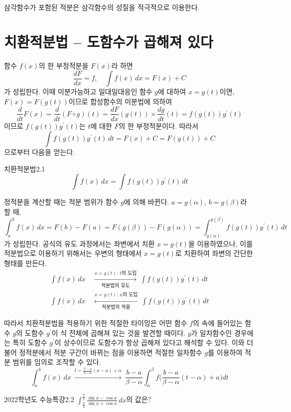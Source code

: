 \documentclass{article}
\begin{document}
\begin{remark}
	삼각함수가 포함된 적분은 삼각함수의 성질을 적극적으로 이용한다.
\end{remark}

\section{치환적분법 -- 도함수가 곱해져 있다}
함수 $f(x)$의 한 부정적분을 $F(x)$라 하면
\[
	\frac{dF}{dx}=f,\quad\int f(x)\,dx=F(x)+C
\]
가 성립한다. 이때 미분가능하고 일대일대응인 함수 $g$에 대하여 $x=g(t)$이면, $F(x)=F(g(t))$이므로 합성함수의 미분법에 의하여
\[
	\frac{d}{dt}F(x)=\frac{d}{dt}(F\circ g)(t)=\frac{dF}{dx}(g(t))\times\frac{dg}{dt}(t)=f(g(t))g^{\prime}(t)
\]
이므로 $f(g(t))g^{\prime}(t)$는 $t$에 대한 $F$의 한 부정적분이다. 따라서 
\[
	\int f(g(t))g^{\prime}(t)\,dt=F(x)+C=F(g(t))+C
\]
으로부터 다음을 얻는다.
\begin{thm}{치환적분법}{2.1}
	\[
		\int f(x)\,dx=\int f(g(t))g^{\prime}(t)\,dt
	\]
\end{thm}

정적분을 계산할 때는 적분 범위가 함수 $g$에 의해 바뀐다. $a=g(\alpha)$, $b=g(\beta)$라 할 때,
\[
	\int_a^bf(x)\,dx=F(b)-F(a)=F(g(\beta))-F(g(\alpha))=\int_{g(\alpha)}^{g(\beta)}f(g(t))g^{\prime}(t)\,dt
\]
가 성립한다. 공식의 유도 과정에서는 좌변에서 치환 $x=g(t)$을 이용하였으나, 이를 적분법으로 이용하기 위해서는 우변의 형태에서 $x=g(t)$로 치환하여 좌변의 간단한 형태를 만든다.
\begin{align*}
	\int f(x)\,dx~&\xrightarrow[\text{적분법의 유도}]{x=g(t):~t\text{의 도입}}~\int f(g(t))g^{\prime}(t)\,dt\\[6pt]
\int f(x)\,dx~&\xleftarrow[\text{적분법의 적용}]{x=g(t):~x\text{의 도입}}~\int f(g(t))g^{\prime}(t)\,dt
\end{align*}

따라서 치환적분법을 적용하기 위한 적절한 타이밍은 어떤 함수 $f$의 속에 들어있는 함수 $g$의 도함수 $g^{\prime}$이 식 전체에 곱해져 있는 것을 발견할 때이다. $g$가 일차함수인 경우에는 특히 도함수 $g^{\prime}$이 상수이므로 도함수가 항상 곱해져 있다고 해석할 수 있다. 이와 더불어 정적분에서 적분 구간이 바뀌는 점을 이용하면 적절한 일차함수 $g$를 이용하여 적분 범위를 임의로 조작할 수 있다.
\[
	\int_a^bf(x)\,dx~\xrightarrow{t=\tfrac{\beta-\alpha}{b-a}(x-a)+\alpha}~\frac{b-a}{\beta-\alpha}\int_\alpha^\beta f\biggl(\frac{b-a}{\beta-\alpha}(t-\alpha)+a\biggr)dt
\]

\begin{exc}{2022학년도 수능특강}{2.2}
	$\displaystyle\int_{\tfrac{\pi}{4}}^{\tfrac{\pi}{2}}\frac{\sin x-\cos x}{\sin x+\cos x}\,dx$의 값은?
\end{exc}
\end{document}
